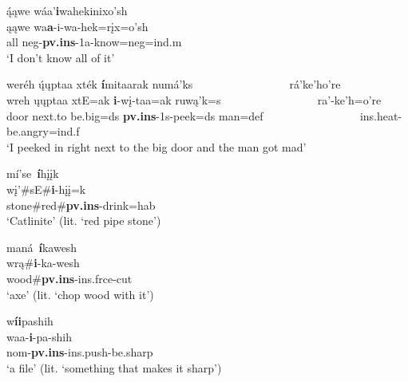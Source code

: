 \begin{exe}
\begin{xlist}
	\item\label{instrumentalexamples4} \glll 
	ą́ąwe wáa'\textbf{i}wahekinixo'sh\\
	ąąwe wa\textbf{a}-i-wa-hek=rįx=o'sh\\
	\textnormal{all} neg-\textbf{pv.ins}-1a-\textnormal{know}=neg=ind.m\\
	\glt 	`I don't know all of it' \citep[47]{hollow1973a}
	
	\item\label{instrumentalexamples5} \glll 
	weréh ų́ųptaa xték \textbf{í}mitaarak numá'ks ~ ~ ~ ~ ~ ~ ~ ~ ~ ~ rá'ke'ho're\\
	wreh ųųptaa xtE=ak \textbf{i}-wį-taa=ak ruwą'k=s ~ ~ ~ ~ ~ ~ ~ ~ ~ ~ ra'-ke'h=o're\\
	\textnormal{door} \textnormal{next.to} \textnormal{be.big}=ds \textbf{pv.ins}-1s-\textnormal{peek}=ds \textnormal{man}=def ~ ~ ~ ~ ~ ~ ~ ~ ~ ~  ins.heat-\textnormal{be.angry}=ind.f\\
	\glt `I peeked in right next to the big door and the man got mad' \citep[98]{hollow1973a}
	
	\item\label{instrumentalexamples6} \glll 
	{mí'se~\textbf{í}hįįk}\\
	wį'\#sE\#\textbf{i}-hįį=k\\
	\textnormal{stone}\#\textnormal{red}\#\textbf{pv.ins}-\textnormal{drink}=hab\\
	\glt `Catlinite' (lit. `red pipe stone') \citep[439]{hollow1970}
	
	\item\label{instrumentalexamples7} \glll maná~\textbf{í}kawesh\\
	wrą\#\textbf{i}-ka-wesh\\
	\textnormal{wood}\#\textbf{pv.ins}-ins.frce-\textnormal{cut}\\
	\glt `axe' (lit. `chop wood with it') \citep[439]{hollow1970}
	
	\item\label{instrumentalexamples8} \glll w\textbf{íi}pashih\\
	waa-\textbf{i}-pa-shih\\
	nom-\textbf{pv.ins}-ins.push-\textnormal{be.sharp}\\
	\glt `a file' (lit. `something that makes it sharp') \citep[439]{hollow1970}
	
	\end{xlist}

\end{exe}

